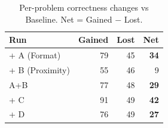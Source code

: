 \begin{table}[ht]
\centering
\caption{Per-problem correctness changes vs Baseline. Net = Gained $-$ Lost.}
\begin{tabular}{lrrr}
\toprule
Run & Gained & Lost & Net \\
\midrule
+ A (Format) & 79 & 45 & \textbf{34} \\
+ B (Proximity) & 55 & 46 & 9 \\
A+B & 77 & 48 & \textbf{29} \\
+ C & 91 & 49 & \textbf{42} \\
+ D & 76 & 49 & \textbf{27} \\
\bottomrule
\end{tabular}
\end{table}